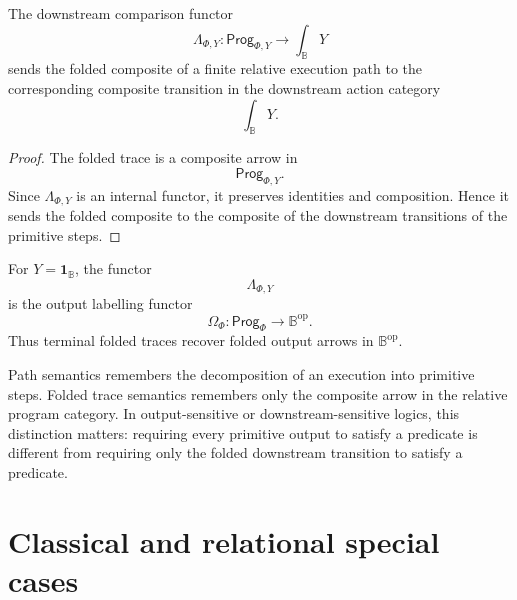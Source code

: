 \begin{proposition}
\label{prop:relative-folded-downstream-transitions}
The downstream comparison functor
\[
\Lambda_{\Phi,Y}:\mathsf{Prog}_{\Phi,Y}\to\int_{\mathbb B}Y
\]
sends the folded composite of a finite relative execution path to the
corresponding composite transition in the downstream action category
\[
\int_{\mathbb B}Y.
\]
\end{proposition}

\begin{proof}
The folded trace is a composite arrow in
\[
\mathsf{Prog}_{\Phi,Y}.
\]
Since \(\Lambda_{\Phi,Y}\) is an internal functor, it preserves identities and
composition. Hence it sends the folded composite to the composite of the
downstream transitions of the primitive steps.
\end{proof}

\begin{corollary}
\label{cor:terminal-folded-outputs}
For \(Y=\mathbf 1_{\mathbb B}\), the functor
\[
\Lambda_{\Phi,Y}
\]
is the output labelling functor
\[
\Omega_\Phi:\mathsf{Prog}_\Phi\to\mathbb B^{\mathrm{op}}.
\]
Thus terminal folded traces recover folded output arrows in
\(\mathbb B^{\mathrm{op}}\).
\end{corollary}

\begin{remark}
\label{rem:path-versus-fold-relative}
Path semantics remembers the decomposition of an execution into primitive
steps. Folded trace semantics remembers only the composite arrow in the
relative program category. In output-sensitive or downstream-sensitive
logics, this distinction matters: requiring every primitive output to satisfy
a predicate is different from requiring only the folded downstream transition
to satisfy a predicate.
\end{remark}

\section{Classical and relational special cases}
\label{sec:classical-relational-special-cases}

